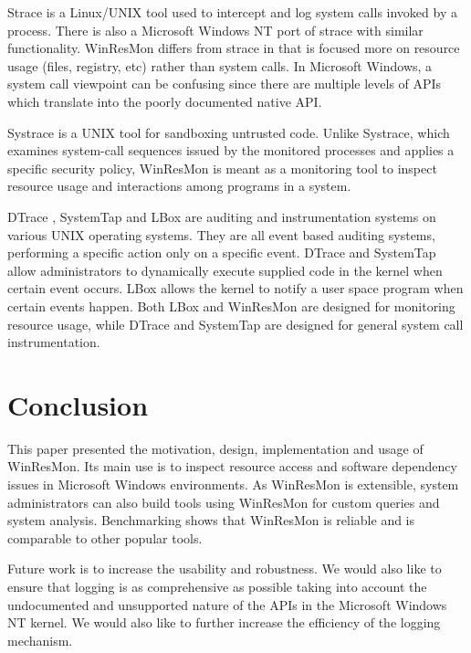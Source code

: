 Strace \cite{strace} is a Linux/UNIX tool used to intercept and log system
calls invoked by a process.  There is also a Microsoft Windows NT port of
strace \cite{bindview} with similar functionality.  WinResMon differs from
strace in that is focused more on resource usage (files, registry, etc) rather
than system calls.  In Microsoft Windows, a system call viewpoint can be
confusing since there are multiple levels of APIs which translate into the poorly
documented native API.

Systrace \cite{systrace} is a UNIX tool for sandboxing untrusted code.  Unlike
Systrace, which examines system-call sequences issued by the monitored
processes and applies a specific security policy, WinResMon is meant as a
monitoring tool to inspect resource usage and interactions among programs in a
system.

DTrace \cite{dtrace}, SystemTap \cite{systemtap} and LBox \cite{lbox} are
auditing and instrumentation systems on various UNIX operating systems.  They
are all event based auditing systems, performing a specific action only on a
specific event.  DTrace and SystemTap allow administrators to dynamically
execute supplied code in the kernel when certain event occurs.  LBox allows
the kernel to notify a user space program when certain events happen.  Both
LBox and WinResMon are designed for monitoring resource usage, while DTrace and
SystemTap are designed for general system call instrumentation.


\section{Conclusion}

This paper presented the motivation, design, implementation and usage of
WinResMon.  Its main use is to inspect resource access and software dependency
issues in Microsoft Windows environments.  As WinResMon is extensible, system
administrators can also build tools using WinResMon for custom queries and
system analysis.  Benchmarking shows that WinResMon is reliable and is
comparable to other popular tools.

Future work is to increase the usability and robustness.
We would also like to ensure that logging is as comprehensive as possible
taking into account the undocumented
and unsupported nature of the APIs in the Microsoft Windows NT kernel.
We would also like to further increase the efficiency of the
logging mechanism.


